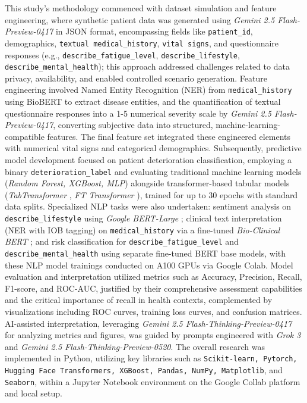 This study's methodology commenced with dataset simulation and feature engineering, where synthetic patient data was generated using \textit{Gemini 2.5 Flash-Preview-0417} \parencite{Doshi_2025} in JSON format, encompassing fields like \texttt{patient\_id}, demographics, \texttt{textual medical\_history}, \texttt{vital signs}, and questionnaire responses (e.g., \texttt{describe\_fatigue\_level}, \texttt{describe\_lifestyle}, \texttt{describe\_mental\_health}); this approach addressed challenges related to data privacy, availability, and enabled controlled scenario generation. Feature engineering involved Named Entity Recognition (NER) from \texttt{medical\_history} using BioBERT \parencite{Lee_2019} to extract disease entities, and the quantification of textual questionnaire responses into a 1-5 numerical severity scale by \textit{Gemini 2.5 Flash-Preview-0417}, converting subjective data into structured, machine-learning-compatible features. The final feature set integrated these engineered elements with numerical vital signs and categorical demographics. Subsequently, predictive model development focused on patient deterioration classification, employing a binary \texttt{deterioration\_label} and evaluating traditional machine learning models (\textit{Random Forest, XGBoost, MLP}) alongside transformer-based tabular models (\textit{TabTransformer} \parencite{huang2020tabtransformertabulardatamodeling}, \textit{FT Transformer} \parencite{gorishniy2023revisitingdeeplearningmodels}), trained for up to 30 epochs with standard data splits. Specialized NLP tasks were also undertaken: sentiment analysis on \texttt{describe\_lifestyle} using \textit{Google BERT-Large} \parencite{devlin2019bertpretrainingdeepbidirectional}; clinical text interpretation (NER with IOB tagging) on \texttt{medical\_history} via a fine-tuned \textit{Bio-Clinical BERT} \parencite{ling2023bioclinicalbertbertbase}; and risk classification for \texttt{describe\_fatigue\_level} and \texttt{describe\_mental\_health} using separate fine-tuned BERT base models, with these NLP model trainings conducted on A100 GPUs via Google Colab. Model evaluation and interpretation utilized metrics such as Accuracy, Precision, Recall, F1-score, and ROC-AUC, justified by their comprehensive assessment capabilities and the critical importance of recall in health contexts, complemented by visualizations including ROC curves, training loss curves, and confusion matrices. AI-assisted interpretation, leveraging \textit{Gemini 2.5 Flash-Thinking-Preview-0417} for analyzing metrics and figures, was guided by prompts engineered with \textit{Grok 3} \parencite{xGrokBeta} and \textit{Gemini 2.5 Flash-Thinking-Preview-0520}. The overall research was implemented in Python, utilizing key libraries such as \texttt{Scikit-learn, Pytorch, Hugging Face Transformers, XGBoost, Pandas, NumPy, Matplotlib}, and \texttt{Seaborn}, within a Jupyter Notebook environment on the Google Collab platform and local setup.